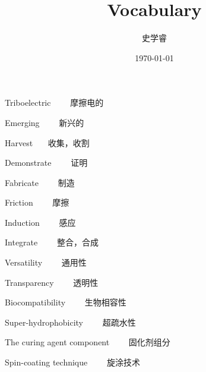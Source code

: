 \documentclass[UTF8]{ctexart}
\begin{document}
\title{Vocabulary}
\author{史学睿}
\date{\today}
\maketitle

    Triboelectric \ \ \ \  摩擦电的

    Emerging \ \ \ \ 新兴的

    Harvest \ \ \  收集，收割

    Demonstrate \ \ \ \ 证明

    Fabricate \ \ \ \ 制造

    Friction \ \ \ \ 摩擦

    Induction \ \ \ \ 感应

    Integrate \ \ \ \ 整合，合成

    Versatility \ \ \ \ 通用性

    Transparency \ \ \ \ 透明性

    Biocompatibility \ \ \ \ 生物相容性

    Super-hydrophobicity \ \ \ \ 超疏水性

    The curing agent component \ \ \ \ 固化剂组分

    Spin-coating technique \ \ \ \ 旋涂技术
\end{document}
